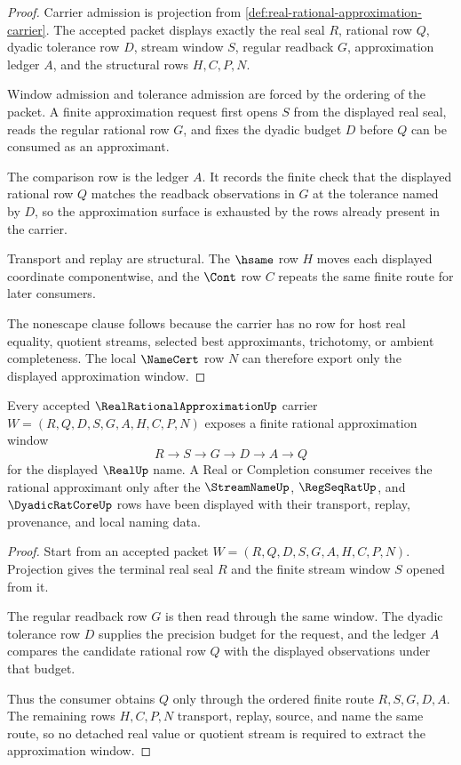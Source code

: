 \begin{proof}
Carrier admission is projection from \autoref{def:real-rational-approximation-carrier}. The accepted packet displays exactly the real seal $R$, rational row $Q$, dyadic tolerance row $D$, stream window $S$, regular readback $G$, approximation ledger $A$, and the structural rows $H,C,P,N$.

Window admission and tolerance admission are forced by the ordering of the packet. A finite approximation request first opens $S$ from the displayed real seal, reads the regular rational row $G$, and fixes the dyadic budget $D$ before $Q$ can be consumed as an approximant.

The comparison row is the ledger $A$. It records the finite check that the displayed rational row $Q$ matches the readback observations in $G$ at the tolerance named by $D$, so the approximation surface is exhausted by the rows already present in the carrier.

Transport and replay are structural. The $\hsame$ row $H$ moves each displayed coordinate componentwise, and the $\Cont$ row $C$ repeats the same finite route for later consumers.

The nonescape clause follows because the carrier has no row for host real equality, quotient streams, selected best approximants, trichotomy, or ambient completeness. The local $\NameCert$ row $N$ can therefore export only the displayed approximation window.
\end{proof}

\begin{theorem}
\label{thm:real-rational-approximation-window-extraction}
Every accepted $\RealRationalApproximationUp$ carrier $W=(R,Q,D,S,G,A,H,C,P,N)$ exposes a finite rational approximation window
$$
R \longrightarrow S \longrightarrow G \longrightarrow D \longrightarrow A \longrightarrow Q
$$
for the displayed $\RealUp$ name. A Real or Completion consumer receives the rational approximant only after the $\StreamNameUp$, $\RegSeqRatUp$, and $\DyadicRatCoreUp$ rows have been displayed with their transport, replay, provenance, and local naming data.
\end{theorem}
\begin{proof}
Start from an accepted packet $W=(R,Q,D,S,G,A,H,C,P,N)$. Projection gives the terminal real seal $R$ and the finite stream window $S$ opened from it.

The regular readback row $G$ is then read through the same window. The dyadic tolerance row $D$ supplies the precision budget for the request, and the ledger $A$ compares the candidate rational row $Q$ with the displayed observations under that budget.

Thus the consumer obtains $Q$ only through the ordered finite route $R,S,G,D,A$. The remaining rows $H,C,P,N$ transport, replay, source, and name the same route, so no detached real value or quotient stream is required to extract the approximation window.
\end{proof}

